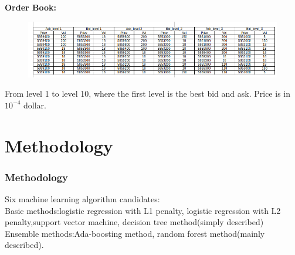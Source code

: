 \documentclass[xcolor={x11names,svgnames,dvipsnames}]{beamer}
\begin{document}
\begin{frame}
	\textbf{Order Book:}
	\begin{figure}
		\includegraphics[width=1\textwidth, height=0.5\textheight]{order_book_new.png}
	\end{figure}
From level \alert{1 to level 10}, where the first level is the best bid and ask. Price is in \alert{$10^{-4}$} dollar.	
\end{frame}



\section{Methodology}
\begin{frame}
\frametitle{Methodology}
Six machine learning algorithm candidates:\\
 \vspace{1cm}
Basic methods:logistic regression with L1 penalty, logistic regression with L2 penalty,support vector machine, decision tree method(\alert{simply described})\\
\vspace{1cm}
Ensemble methods:Ada-boosting method, random forest method(\alert{mainly described}).


\end{frame}
\end{document}
